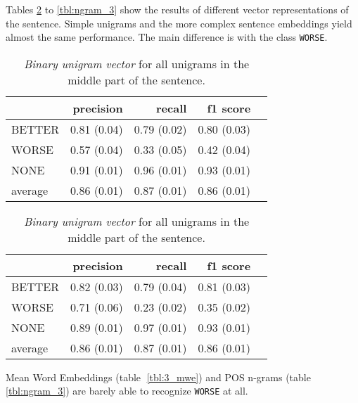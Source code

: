Tables \ref{tbl:se3} to \ref{tbl:ngram_3} show the results of different vector representations of the sentence. Simple unigrams and the more complex sentence embeddings yield almost the same performance. The main difference is with the class \texttt{WORSE}.


\begin{table}[h]
    \begin{minipage}{.5\linewidth}
    
        \caption{\emph{Sentence embeddings on the middle part of the sentence}. (Standard derivation)} 
        \label{tbl:se3}
\begin{tabular}{@{}lrrrr@{}}
\toprule
 	&	 precision &	 recall &	 f1 score  \\ \midrule 
BETTER	&	 0.81 \scriptsize{(0.04)} &	 0.79 \scriptsize{(0.02)} &	 0.80 \scriptsize{(0.03)}  \\ 
WORSE	&	 0.57 \scriptsize{(0.04)} &	 0.33 \scriptsize{(0.05)} &	 0.42 \scriptsize{(0.04)}  \\ 
NONE	&	 0.91 \scriptsize{(0.01)} &	 0.96 \scriptsize{(0.01)} &	 0.93 \scriptsize{(0.01)}  \\ 
average	&	 0.86 \scriptsize{(0.01)} &	 0.87 \scriptsize{(0.01)} &	 0.86 \scriptsize{(0.01)}  \\ 
\bottomrule
\end{tabular}
  \end{minipage} \hfill
    \begin{minipage}{.5\linewidth}
    \caption{ \emph{Binary unigram vector} for all unigrams in the middle part of the sentence. } 
         \begin{tabular}{@{}lrrrr@{}}
\toprule
 	&	 precision &	 recall &	 f1 score  \\ \midrule 
BETTER	&	 0.82 \scriptsize{(0.03)} &	 0.79 \scriptsize{(0.04)} &	 0.81 \scriptsize{(0.03)}  \\ 
WORSE	&	 0.71 \scriptsize{(0.06)} &	 0.23 \scriptsize{(0.02)} &	 0.35 \scriptsize{(0.02)}  \\ 
NONE	&	 0.89 \scriptsize{(0.01)} &	 0.97 \scriptsize{(0.01)} &	 0.93 \scriptsize{(0.01)}  \\ 
average	&	 0.86 \scriptsize{(0.01)} &	 0.87 \scriptsize{(0.01)} &	 0.86 \scriptsize{(0.01)}  \\ 
\bottomrule
\end{tabular}
    \end{minipage} 
\end{table}

Mean Word Embeddings (table \ref{tbl:3_mwe}) and POS n-grams (table \ref{tbl:ngram_3}) are barely able to recognize \texttt{WORSE} at all.

